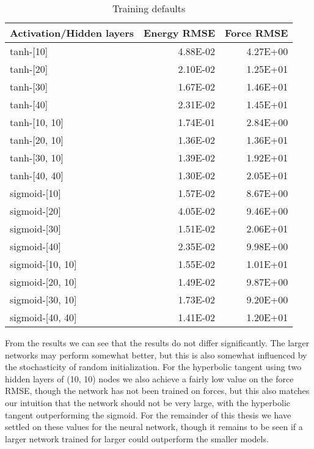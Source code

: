 \begin{table}
\begin{tabular}{lrr}
\toprule
Activation/Hidden layers &  Energy RMSE &  Force RMSE \\
\midrule
               tanh-[10] &     4.88E-02 &    4.27E+00 \\
               tanh-[20] &     2.10E-02 &    1.25E+01 \\
               tanh-[30] &     1.67E-02 &    1.46E+01 \\
               tanh-[40] &     2.31E-02 &    1.45E+01 \\
           tanh-[10, 10] &     1.74E-01 &    2.84E+00 \\
           tanh-[20, 10] &     1.36E-02 &    1.36E+01 \\
           tanh-[30, 10] &     1.39E-02 &    1.92E+01 \\
           tanh-[40, 40] &     1.30E-02 &    2.05E+01 \\
            sigmoid-[10] &     1.57E-02 &    8.67E+00 \\
            sigmoid-[20] &     4.05E-02 &    9.46E+00 \\
            sigmoid-[30] &     1.51E-02 &    2.06E+01 \\
            sigmoid-[40] &     2.35E-02 &    9.98E+00 \\
        sigmoid-[10, 10] &     1.55E-02 &    1.01E+01 \\
        sigmoid-[20, 10] &     1.49E-02 &    9.87E+00 \\
        sigmoid-[30, 10] &     1.73E-02 &    9.20E+00 \\
        sigmoid-[40, 40] &     1.41E-02 &    1.20E+01 \\
\bottomrule
\end{tabular}
\caption{Training defaults}
\label{table:act-hidden}
\end{table}

From the results we can see that the results do not
differ significantly. The larger networks may perform somewhat
better, but this is also somewhat influenced by the stochasticity
of random initialization. For the hyperbolic tangent using
two hidden layers of (10, 10) nodes we also achieve a fairly
low value on the force RMSE, though the network has not been trained
on forces, but this also matches our intuition that the network
should not be very large, with the hyperbolic tangent outperforming
the sigmoid. For the remainder of this thesis we have settled
on these values for the neural network, though it remains
to be seen if a larger network trained for larger could outperform
the smaller models.

